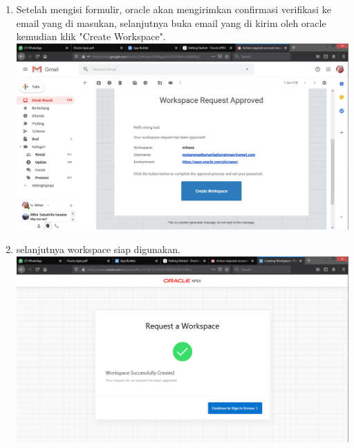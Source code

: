 \documentclass[12pt]{article}
\begin{document}
\begin{enumerate}
		\item Setelah mengisi formulir, oracle akan mengirimkan confirmasi verifikasi ke email yang di masukan, selanjutnya buka email yang di kirim oleh oracle kemudian klik "Create Workspace".\\
		\includegraphics[scale=0.3]{src/4}
		\item selanjutnya workspace siap digunakan.\\
		\includegraphics[scale=0.3]{src/5}
	
	\end{enumerate}
	
\end{document}
